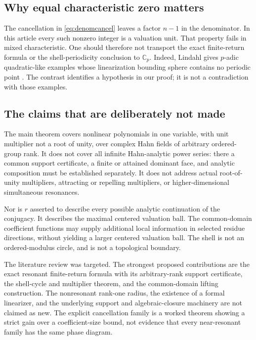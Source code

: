 \documentclass[11pt,letterpaper]{article}
\numberwithin{equation}{section}
\theoremstyle{plain}
\theoremstyle{definition}
\theoremstyle{remark}
\newcommand{\C}{\mathbb C}
\begin{document}
\subsection{Why equal characteristic zero matters}

The cancellation in \eqref{eq:denomcancel} leaves a factor $n-1$ in the
denominator. In this article every such nonzero integer is a valuation unit.
That property fails in mixed characteristic. One should therefore not
transport the exact finite-return formula or the shell-periodicity conclusion
to $\C_p$. Indeed, Lindahl gives $p$-adic quadratic-like examples whose
linearization bounding sphere contains no periodic point
\cite[Corollary~C]{lindahl-padic}. The contrast identifies a hypothesis in
our proof; it is not a contradiction with those examples.

\subsection{The claims that are deliberately not made}

The main theorem covers nonlinear polynomials in one variable, with unit
multiplier not a root of unity, over complex Hahn fields of arbitrary
ordered-group rank. It does not cover all infinite Hahn-analytic power
series: there a common support certificate, a finite or attained dominant
face, and analytic composition must be established separately. It does not
address actual root-of-unity multipliers, attracting or repelling multipliers,
or higher-dimensional simultaneous resonances.

Nor is $r$ asserted to describe every possible analytic continuation of the
conjugacy. It describes the maximal centered valuation ball. The common-domain
coefficient functions may supply additional local information in selected
residue directions, without yielding a larger centered valuation ball.
The shell is not an ordered-modulus circle, and is not a topological boundary.

The literature review was targeted. The strongest proposed contributions
are the exact resonant finite-return formula with its arbitrary-rank support
certificate, the shell-cycle and multiplier theorem, and the common-domain
lifting construction. The nonresonant rank-one radius, the existence of a
formal linearizer, and the underlying support and algebraic-closure machinery
are not claimed as new. The explicit cancellation family is a worked theorem
showing a strict gain over a coefficient-size bound, not evidence that every
near-resonant family has the same phase diagram.
\end{document}
